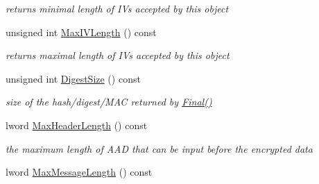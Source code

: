 \begin{DoxyCompactItemize}
\begin{DoxyCompactList}\small\item\em returns minimal length of IVs accepted by this object \item\end{DoxyCompactList}\item 
\hypertarget{class_c_c_m___base_a7e4b48a416d4f8dd988e4f3d12571a0b}{
unsigned int \hyperlink{class_c_c_m___base_a7e4b48a416d4f8dd988e4f3d12571a0b}{MaxIVLength} () const }
\label{class_c_c_m___base_a7e4b48a416d4f8dd988e4f3d12571a0b}

\begin{DoxyCompactList}\small\item\em returns maximal length of IVs accepted by this object \item\end{DoxyCompactList}\item 
\hypertarget{class_c_c_m___base_a8b08deb347a3901ed487be2bb97c2c2f}{
unsigned int \hyperlink{class_c_c_m___base_a8b08deb347a3901ed487be2bb97c2c2f}{DigestSize} () const }
\label{class_c_c_m___base_a8b08deb347a3901ed487be2bb97c2c2f}

\begin{DoxyCompactList}\small\item\em size of the hash/digest/MAC returned by \hyperlink{class_hash_transformation_aa0b8c7a110d8968268fd02ec32b9a8e8}{Final()} \item\end{DoxyCompactList}\item 
\hypertarget{class_c_c_m___base_ad97b696e66dde5d66c29944db73fbec2}{
lword \hyperlink{class_c_c_m___base_ad97b696e66dde5d66c29944db73fbec2}{MaxHeaderLength} () const }
\label{class_c_c_m___base_ad97b696e66dde5d66c29944db73fbec2}

\begin{DoxyCompactList}\small\item\em the maximum length of AAD that can be input before the encrypted data \item\end{DoxyCompactList}\item 
\hypertarget{class_c_c_m___base_a278a0a6a43d3327faeb7cd2ab111ff72}{
lword \hyperlink{class_c_c_m___base_a278a0a6a43d3327faeb7cd2ab111ff72}{MaxMessageLength} () const }
\label{class_c_c_m___base_a278a0a6a43d3327faeb7cd2ab111ff72}


\end{DoxyCompactItemize}
